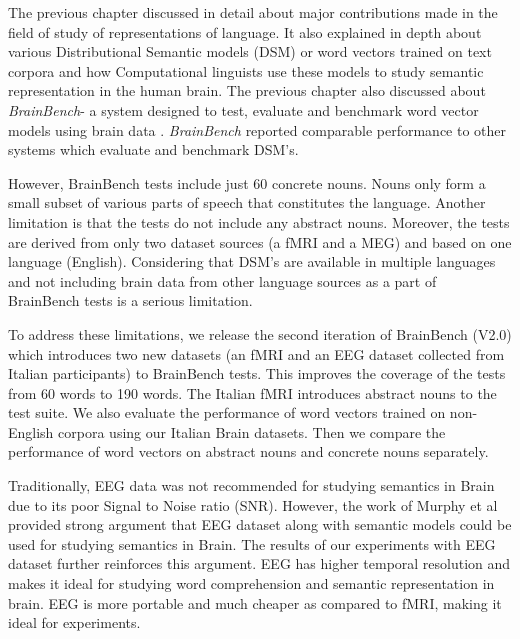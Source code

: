 \label{chapter:newsol}

The previous chapter discussed in detail about major contributions made in the field of study of representations of language. It also explained in depth about various Distributional Semantic models (DSM) or word vectors trained on text corpora and how Computational linguists use these models to study semantic representation in the human brain. The previous chapter also discussed about \textit{BrainBench}- a system designed to test, evaluate and benchmark word vector models using brain data \cite{BrainBench2016}. \textit{BrainBench} reported comparable performance to other systems which evaluate and benchmark DSM's.



However, BrainBench tests include just 60 concrete nouns.  Nouns only form a small subset of various parts of speech that constitutes the language. Another limitation is that the tests do not include any abstract nouns. Moreover, the tests are derived from only two dataset sources (a fMRI and a MEG) and based on one language (English). Considering that DSM's are available in multiple languages and not including brain data from other language sources as a part of BrainBench tests is a serious limitation. 

To address these limitations, we release the second iteration of BrainBench (V2.0) which introduces two new datasets (an fMRI and an EEG dataset collected from Italian participants) to BrainBench tests. This improves the coverage of the tests from 60 words to 190 words. The Italian fMRI introduces abstract nouns to the test suite. We also evaluate the performance of word vectors trained on non-English corpora using our Italian Brain datasets. Then we compare the performance of word vectors on abstract nouns and concrete nouns separately.

Traditionally, EEG data was not recommended for studying semantics in Brain due to its poor Signal to Noise ratio (SNR). However, the work of Murphy et al \cite{MurphyEEG} provided strong argument that EEG dataset along with semantic models could be used for studying semantics in Brain. The results of our experiments with EEG dataset further reinforces this argument. EEG has higher temporal resolution and makes it ideal for studying word comprehension and semantic representation in brain. EEG is more portable and much cheaper as compared to fMRI, making it ideal for experiments.




